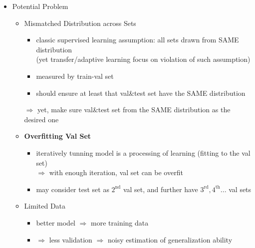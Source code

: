 \begin{itemize}
\item Potential Problem
	\begin{itemize}
	\item Mismatched Distribution across Sets
		\begin{itemize}
		\item classic supervised learning assumption: all sets drawn from SAME distribution \\
		(yet transfer/adaptive learning focus on violation of such assumption)
		\item measured by train-val set
		\item should ensure at least that val\&test set have the SAME distribution
		\end{itemize}
		$\Rightarrow$ yet, make sure val\&test set from the SAME distribution as the desired one
	\item \textbf{Overfitting Val Set}
		\begin{itemize}
		\item iteratively tunning model is a processing of learning (fitting to the val set) \\
		$\Rightarrow$ with enough iteration, val set can be overfit
		\item may consider test set as $2^\text{nd}$ val set, and further have $3^\text{rd}, 4^\text{th}...$ val sets
		\end{itemize}
	\item Limited Data
		\begin{itemize}
		\item better model $\Rightarrow$ more training data 
		\item $\Rightarrow$ less validation $\Rightarrow$ noisy estimation of generalization ability
		\end{itemize}
	\end{itemize}
\end{itemize}

